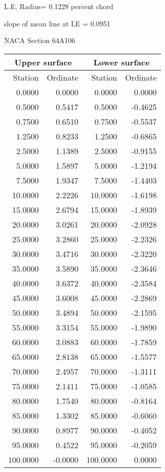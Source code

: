 \documentclass[11pt]{book}
\begin{document}
L.E. Radius=  0.1228 percent chord


 slope of mean line at LE =  0.0951
 \newpage
  \label{s64A106}
 \begin{Large}
 NACA Section 64A106
 \end{Large}
  
 \vspace{8mm}
 \begin{tabular}{|r|r|r|r|} \hline 
 \multicolumn{2}{|c|}{Upper surface} & \multicolumn{2}{|c|}{Lower surface} \\
 \hline
 Station & Ordinate & Station & Ordinate \\
 \hline
0.0000 & 0.0000 & 0.0000 & 0.0000 \\
0.5000 & 0.5417 & 0.5000 & -0.4625 \\
0.7500 & 0.6510 & 0.7500 & -0.5537 \\
1.2500 & 0.8233 & 1.2500 & -0.6865 \\
2.5000 & 1.1389 & 2.5000 & -0.9155 \\
5.0000 & 1.5897 & 5.0000 & -1.2194 \\
7.5000 & 1.9347 & 7.5000 & -1.4403 \\
10.0000 & 2.2226 & 10.0000 & -1.6198 \\
15.0000 & 2.6794 & 15.0000 & -1.8939 \\
20.0000 & 3.0261 & 20.0000 & -2.0928 \\
25.0000 & 3.2860 & 25.0000 & -2.2326 \\
30.0000 & 3.4716 & 30.0000 & -2.3220 \\
35.0000 & 3.5890 & 35.0000 & -2.3646 \\
40.0000 & 3.6372 & 40.0000 & -2.3584 \\
45.0000 & 3.6008 & 45.0000 & -2.2869 \\
50.0000 & 3.4894 & 50.0000 & -2.1595 \\
55.0000 & 3.3154 & 55.0000 & -1.9890 \\
60.0000 & 3.0883 & 60.0000 & -1.7859 \\
65.0000 & 2.8138 & 65.0000 & -1.5577 \\
70.0000 & 2.4957 & 70.0000 & -1.3111 \\
75.0000 & 2.1411 & 75.0000 & -1.0585 \\
80.0000 & 1.7540 & 80.0000 & -0.8164 \\
85.0000 & 1.3302 & 85.0000 & -0.6060 \\
90.0000 & 0.8977 & 90.0000 & -0.4052 \\
95.0000 & 0.4522 & 95.0000 & -0.2059 \\
100.0000 & -0.0000 & 100.0000 & 0.0000 \\
 \hline 
 \end{tabular}
\end{document}
